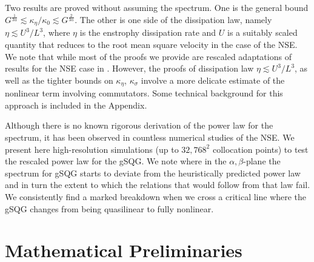\documentclass[twoside, reqno]{amsart}
\numberwithin{lemma}{section}
\numberwithin{theorem}{section}
\numberwithin{proposition}{section}
\numberwithin{equation}{section} %
\newcommand{\ka}{\kappa}
\begin{document}
Two results are proved without assuming the spectrum.  One is the general bound $G^{\frac{1}{3\alpha}} \lesssim \ka_\eta/ \ka_0 \lesssim G^{\frac{2}{3\alpha}}$. The other is one side of the dissipation law, namely $\eta \lesssim U^3/L^3$, where $\eta$ is the enstrophy dissipation rate and $U$ is a suitably scaled quantity that reduces to the root mean square velocity in the case of the NSE.  
We note that while most of the proofs we provide are rescaled adaptations of results for the NSE case in \cite{FJMR2002, Dascaliuc2008}. However, the proofs of dissipation law $\eta \lesssim U^3/L^3$, as well as the tighter bounds on $\ka_\eta$, $\ka_\sigma$ involve a more delicate estimate of the nonlinear term involving commutators. Some technical background for this approach is included in the Appendix. 


Although there is no known rigorous derivation of the power law for the spectrum, it has been observed in countless numerical studies of the NSE.   We present here high-resolution simulations (up to $32,768^2$ collocation points) to test the rescaled power law for the gSQG.  We note where in the $\alpha,\beta$-plane the spectrum for gSQG starts to deviate from the heuristically predicted power law and in turn the extent to which the relations that would follow from that law fail.  We consistently find a marked breakdown when we cross a critical line where the gSQG changes from being quasilinear to fully nonlinear. 

\section{Mathematical Preliminaries}
\end{document}
